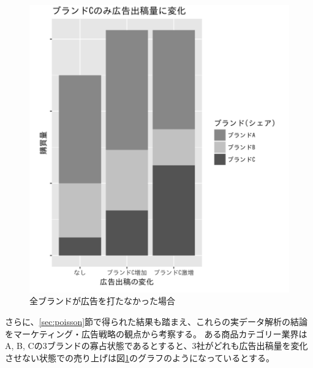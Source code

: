 \documentclass[11pt]{jsarticle}
\begin{document}
\begin{figure}[htbp]
 \centering
\begin{minipage}{0.6\columnwidth}
 \centering
 \includegraphics[width=\columnwidth]{./fig/3-4-3.png}
 \caption{全ブランドが広告を打たなかった場合}
 \label{fig:3-4-3}
\end{minipage}
\end{figure}

さらに、\ref{sec:poisson}節で得られた結果も踏まえ、これらの実データ解析の結論をマーケティング・広告戦略の観点から考察する。
ある商品カテゴリー業界はA, B, Cの3ブランドの寡占状態であるとすると、3社がどれも広告出稿量を変化させない状態での売り上げは図\ref{fig:3-4-3}のグラフのようになっているとする。
\end{document}
